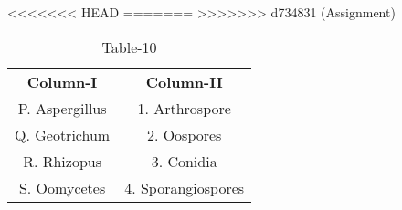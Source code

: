 \begin{table}[htbp]
  \centering
  \caption{Table-10}
<<<<<<< HEAD
  \label{tab:tables/table10.tex}
=======
  \label{table10}
>>>>>>> d734831 (Assignment)
  \begin{tabular}{cc}
\textbf{Column-I} & \textbf{Column-II}\\

P. Aspergillus & 1. Arthrospore \\
Q. Geotrichum & 2. Oospores \\
R. Rhizopus & 3. Conidia \\
S. Oomycetes & 4. Sporangiospores \\
  
  
  
  \end{tabular}
\end{table}